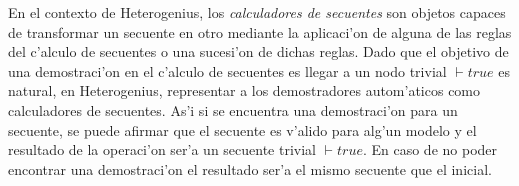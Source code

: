 
En el contexto de Heterogenius, los \textit{calculadores de secuentes} son objetos capaces de transformar un secuente en otro mediante la aplicaci'on de alguna de las reglas del c'alculo de secuentes o una sucesi'on de dichas reglas.
Dado que el objetivo de una demostraci'on en el c'alculo de secuentes es llegar a un nodo trivial $\vdash true$ es natural, en Heterogenius, representar a los demostradores autom'aticos como calculadores de secuentes. As'i si se encuentra una demostraci'on para un secuente, se puede afirmar que el secuente es v'alido para alg'un modelo y el resultado de la operaci'on ser'a un secuente trivial $\vdash true$. En caso de no poder encontrar una demostraci'on el resultado ser'a el mismo secuente que el inicial.